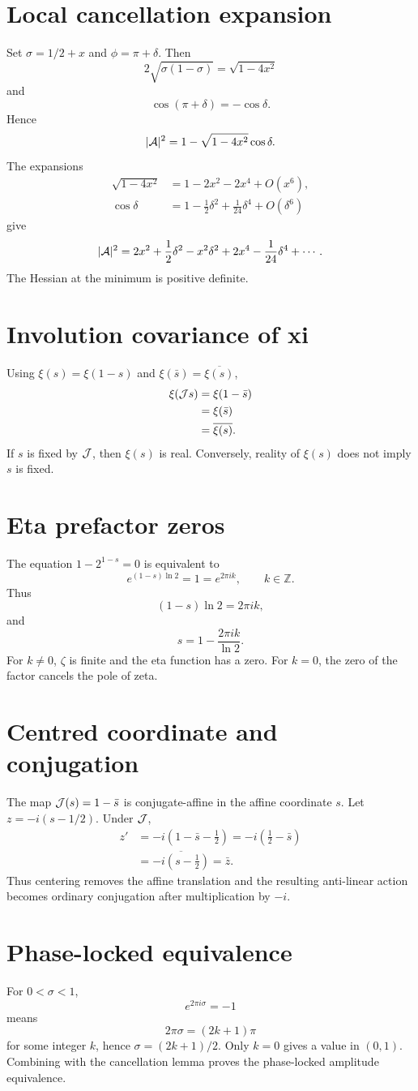 \section{Local cancellation expansion}

Set $\sigma=1/2+x$ and $\phi=\pi+\delta$. Then
\[
 2\sqrt{\sigma(1-\sigma)}=\sqrt{1-4x^2}
\]
and
\[
 \cos(\pi+\delta)=-\cos\delta.
\]
Hence
\[
 |\mathcal{A}|^2=1-\sqrt{1-4x^2}\cos\delta.
\]
The expansions
\begin{align*}
 \sqrt{1-4x^2}&=1-2x^2-2x^4+O(x^6),\\
 \cos\delta&=1-\frac12\delta^2+\frac1{24}\delta^4+O(\delta^6)
\end{align*}
give
\[
 |\mathcal{A}|^2=2x^2+\frac12\delta^2-x^2\delta^2+2x^4-\frac1{24}\delta^4+\cdots.
\]
The Hessian at the minimum is positive definite.

\section{Involution covariance of xi}

Using $\xi(s)=\xi(1-s)$ and $\xi(\bar s)=\overline{\xi(s)}$,
\begin{align*}
 \xi(\mathcal{J} s)
 &=\xi(1-\bar s)\\
 &=\xi(\bar s)\\
 &=\overline{\xi(s)}.
\end{align*}
If $s$ is fixed by $\mathcal{J}$, then $\xi(s)$ is real. Conversely, reality of $\xi(s)$ does not imply $s$ is fixed.

\section{Eta prefactor zeros}

The equation $1-2^{1-s}=0$ is equivalent to
\[
 e^{(1-s)\ln2}=1=e^{2\pi ik},\qquad k\in\mathbb Z.
\]
Thus
\[
 (1-s)\ln2=2\pi ik,
\]
and
\[
 s=1-\frac{2\pi ik}{\ln2}.
\]
For $k\neq0$, $\zeta$ is finite and the eta function has a zero. For $k=0$, the zero of the factor cancels the pole of zeta.

\section{Centred coordinate and conjugation}

The map $\mathcal{J}(s)=1-\bar s$ is conjugate-affine in the affine coordinate $s$. Let $z=-i(s-1/2)$. Under $\mathcal{J}$,
\begin{align*}
 z'&=-i\left(1-\bar s-\frac12\right)
 =-i\left(\frac12-\bar s\right)\\
 &=\overline{-i\left(s-\frac12\right)}=\bar z.
\end{align*}
Thus centering removes the affine translation and the resulting anti-linear action becomes ordinary conjugation after multiplication by $-i$.

\section{Phase-locked equivalence}

For $0<\sigma<1$,
\[
 e^{2\pi i\sigma}=-1
\]
means
\[
 2\pi\sigma=(2k+1)\pi
\]
for some integer $k$, hence $\sigma=(2k+1)/2$. Only $k=0$ gives a value in $(0,1)$. Combining with the cancellation lemma proves the phase-locked amplitude equivalence.
